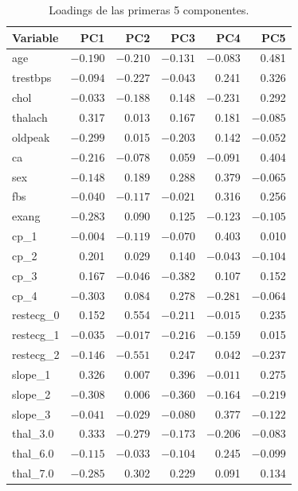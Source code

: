 \documentclass[11pt,a4paper]{article}
\begin{document}
\begin{table}[H]
  \centering
  \caption{Loadings de las primeras 5 componentes.}
  \label{tab:loadings}
  \footnotesize
  \begin{tabular}{@{}lrrrrr@{}}
    \toprule
    \textbf{Variable} & \textbf{PC1} & \textbf{PC2} & \textbf{PC3} & \textbf{PC4} & \textbf{PC5} \\
    \midrule
    age & $-0.190$ & $-0.210$ & $-0.131$ & $-0.083$ & 0.481 \\
    trestbps & $-0.094$ & $-0.227$ & $-0.043$ & 0.241 & 0.326 \\
    chol & $-0.033$ & $-0.188$ & 0.148 & $-0.231$ & 0.292 \\
    thalach & 0.317 & 0.013 & 0.167 & 0.181 & $-0.085$ \\
    oldpeak & $-0.299$ & 0.015 & $-0.203$ & 0.142 & $-0.052$ \\
    ca & $-0.216$ & $-0.078$ & 0.059 & $-0.091$ & 0.404 \\
    sex & $-0.148$ & 0.189 & 0.288 & 0.379 & $-0.065$ \\
    fbs & $-0.040$ & $-0.117$ & $-0.021$ & 0.316 & 0.256 \\
    exang & $-0.283$ & 0.090 & 0.125 & $-0.123$ & $-0.105$ \\
    cp\_1 & $-0.004$ & $-0.119$ & $-0.070$ & 0.403 & 0.010 \\
    cp\_2 & 0.201 & 0.029 & 0.140 & $-0.043$ & $-0.104$ \\
    cp\_3 & 0.167 & $-0.046$ & $-0.382$ & 0.107 & 0.152 \\
    cp\_4 & $-0.303$ & 0.084 & 0.278 & $-0.281$ & $-0.064$ \\
    restecg\_0 & 0.152 & 0.554 & $-0.211$ & $-0.015$ & 0.235 \\
    restecg\_1 & $-0.035$ & $-0.017$ & $-0.216$ & $-0.159$ & 0.015 \\
    restecg\_2 & $-0.146$ & $-0.551$ & 0.247 & 0.042 & $-0.237$ \\
    slope\_1 & 0.326 & 0.007 & 0.396 & $-0.011$ & 0.275 \\
    slope\_2 & $-0.308$ & 0.006 & $-0.360$ & $-0.164$ & $-0.219$ \\
    slope\_3 & $-0.041$ & $-0.029$ & $-0.080$ & 0.377 & $-0.122$ \\
    thal\_3.0 & 0.333 & $-0.279$ & $-0.173$ & $-0.206$ & $-0.083$ \\
    thal\_6.0 & $-0.115$ & $-0.033$ & $-0.104$ & 0.245 & $-0.099$ \\
    thal\_7.0 & $-0.285$ & 0.302 & 0.229 & 0.091 & 0.134 \\
    \bottomrule
  \end{tabular}
\end{table}
\end{document}
